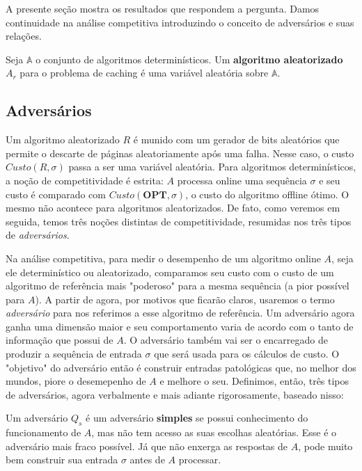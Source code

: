 A presente seção mostra os resultados que respondem a pergunta. Damos continuidade na análise competitiva introduzindo o conceito de adversários e suas relações.

\begin{definition}
  Seja \(\mathbb{A}\) o conjunto de algoritmos determinísticos. Um \textbf{algoritmo aleatorizado} \(A_r\) para o problema de caching é uma variável aleatória sobre \(\mathbb{A}\). 
\end{definition}


\subsection{Adversários}

Um algoritmo aleatorizado \(R\) é munido com um gerador de bits aleatórios que permite o descarte de páginas aleatoriamente após uma falha. Nesse caso, o custo \(Custo(R,\sigma)\) passa a ser uma variável aleatória. Para algoritmos determinísticos, a noção de competitividade é estrita: \(A\) processa online uma sequência \(\sigma\) e seu custo é comparado com \(Custo(\textbf{OPT}, \sigma)\), o custo do algoritmo offline ótimo. O mesmo não acontece para algoritmos aleatorizados. De fato, como veremos em seguida, temos três noções distintas de competitividade, resumidas nos três tipos de \textit{adversários}. 

Na análise competitiva, para medir o desempenho de um algoritmo online \(A\), seja ele determinístico ou aleatorizado, comparamos seu custo com o custo de um algoritmo de referência mais "poderoso" para a mesma sequência (a pior possível para \(A\)). 
A partir de agora, por motivos que ficarão claros, usaremos o termo \textit{adversário} para nos referimos a esse algoritmo de referência. Um adversário agora ganha uma dimensão maior e seu comportamento varia de acordo com o tanto de informação que possui de \(A\). O adversário também vai ser o encarregado de produzir a sequência de entrada \(\sigma\) que será usada para os cálculos de custo. O "objetivo" do adversário então é construir entradas patológicas que, no melhor dos mundos, piore o desemepenho de \(A\) e melhore o seu. Definimos, então, três tipos de adversários, agora verbalmente e mais adiante rigorosamente, baseado nisso:

\begin{definition}
  Um adversário \(Q_s\) é um adversário \textbf{simples} se possui conhecimento do funcionamento de \(A\), mas não tem acesso as suas escolhas aleatórias. Esse é o adversário mais fraco possível. Já que não enxerga as respostas de \(A\), pode muito bem construir sua entrada \(\sigma\) antes de \(A\) processar. 
\end{definition}

